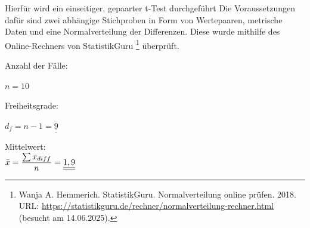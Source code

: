 \noindent
Hierfür wird ein einseitiger, gepaarter t-Test durchgeführt \cites[Zusammenfassung nach][]{MathiasJesussek:DATAtab:2025}[S. 414]{Statistik:Sedlmeier:2018} Die Voraussetzungen dafür sind zwei abhängige Stichproben in Form von Wertepaaren, metrische Daten und eine Normalverteilung der Differenzen. Diese wurde mithilfe des Online-Rechners von StatistikGuru \footnote{Wanja A. Hemmerich. StatistikGuru. Normalverteilung online prüfen. 2018. URL: \url{https://statistikguru.de/rechner/normalverteilung-rechner.html} (besucht am 14.06.2025).} überprüft.\\

\noindent
\begin{minipage}[t]{0.3\linewidth}
    \raggedright
    \noindent
    Anzahl der Fälle:

    $\displaystyle n = 10$
\end{minipage}
\begin{minipage}[t]{0.3\linewidth}
    \raggedright   
    \noindent
    Freiheitsgrade:

    \indent
    $\displaystyle d_f = n-1 = \underline{\underline{9}}$
\end{minipage}
\begin{minipage}[t]{0.3\linewidth}
    \raggedright
    \noindent
    Mittelwert:\\
    \vspace{1.5mm}
    $\displaystyle \Bar{x}   = \frac{\sum{x_{diff}}}{n} = \underline{\underline{1,9}}$
\end{minipage}






